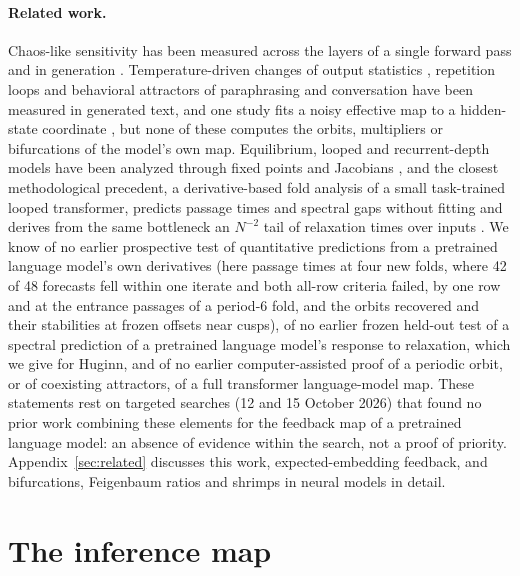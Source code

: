 \documentclass[11pt,letterpaper]{article}
\begin{document}
\paragraph{Related work.} Chaos-like sensitivity has been measured across the layers of a single forward pass
\cite{li2025quasilyapunov,islam2026numerical} and in generation \cite{jaca2026chaos,verazuniga2026selffeeding}. Temperature-driven changes
of output statistics \cite{arnold2024phase,nakaishi2024phase,sun2025phase,ruan2026criticality}, repetition loops
\cite{holtzman2019degeneration,xu2022loop,pipis2026loop,farid2026threeclocks} and behavioral attractors of paraphrasing and conversation
\cite{wang2025attractor,tacheny2025geometric,ko2026attractor} have been measured in generated text, and one study fits a noisy effective
map to a hidden-state coordinate \cite{johnson2026temperature}, but none of these computes the orbits, multipliers or
bifurcations of the model's own map. Equilibrium, looped and recurrent-depth models have been analyzed through fixed
points and Jacobians \cite{bai2019deq,bai2021stabilizing,geiping2025recurrent,tomihari2025recurrent,yang2026stars},
and the closest methodological precedent, a derivative-based fold analysis of a small task-trained looped transformer, predicts
passage times and spectral gaps without fitting and derives from the same bottleneck an $N^{-2}$ tail of relaxation
times over inputs \cite{kim2026phase}. We know of no earlier prospective test of quantitative predictions from a
pretrained language model's own derivatives (here passage times at four new folds, where 42 of 48 forecasts fell
within one iterate and both all-row criteria failed, by one row and at the entrance passages of a period-6 fold, and
the orbits recovered and their stabilities at frozen offsets near cusps), of no earlier frozen held-out test of a
spectral prediction of a pretrained language model's response to relaxation, which we give for Huginn, and of no
earlier computer-assisted proof of a periodic orbit, or of coexisting attractors, of a full transformer
language-model map. These statements rest on targeted searches (12 and 15 October 2026) that found no prior work
combining these elements for the feedback map of a pretrained language model: an absence of evidence within the
search, not a proof of priority. Appendix~\ref{sec:related} discusses this work, expected-embedding feedback, and
bifurcations, Feigenbaum ratios and shrimps in neural models in detail.

\section{The inference map}
\label{sec:map}
\end{document}
